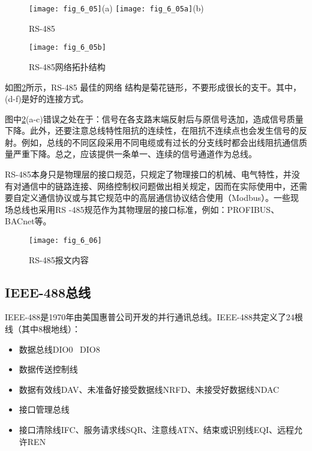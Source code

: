 \begin{figure}
  \centering
  \texttt{[image: fig\_6\_05]}(a)
  \texttt{[image: fig\_6\_05a]}(b)
  \caption{RS-485}\label{fig_6_05}
\end{figure}


\begin{figure}
  \centering
  \texttt{[image: fig\_6\_05b]}
  \caption{RS-485网络拓扑结构}\label{fig_6_05a}
\end{figure}

如图\ref{fig_6_05a}所示，RS-485 最佳的网络 结构是菊花链形，不要形成很长的支干。其中，(d-f)是好的连接方式。


\begin{remark}

图中\ref{fig_6_05a}(a-c)错误之处在于：信号在各支路末端反射后与原信号迭加，造成信号质量下降。此外，还要注意总线特性阻抗的连续性，在阻抗不连续点也会发生信号的反射。例如，总线的不同区段采用不同电缆或有过长的分支线时都会出线阻抗通信质量严重下降。总之，应该提供一条单一、连续的信号通道作为总线。
\end{remark}


RS-485本身只是物理层的接口规范，只规定了物理接口的机械、电气特性，并没有对通信中的链路连接、网络控制权问题做出相关规定，因而在实际使用中，还需要自定义通信协议或与其它规范中的高层通信协议结合使用（Modbus）。一些现场总线也采用RS -485规范作为其物理层的接口标准，例如：PROFIBUS、BACnet等。


\begin{figure}
  \centering
  \texttt{[image: fig\_6\_06]}
  \caption{RS-485报文内容}\label{fig_6_06}
\end{figure}


\subsection{IEEE-488总线}


IEEE-488是1970年由美国惠普公司开发的并行通讯总线。IEEE-488共定义了24根线（其中8根地线）：

\begin{itemize}
  \item
数据总线DIO0~ DIO8
\item 数据传送控制线
\item 数据有效线DAV、未准备好接受数据线NRFD、未接受好数据线NDAC
\item 接口管理总线
\item 接口清除线IFC、服务请求线SQR、注意线ATN、结束或识别线EQI、远程允许REN

\end{itemize}

